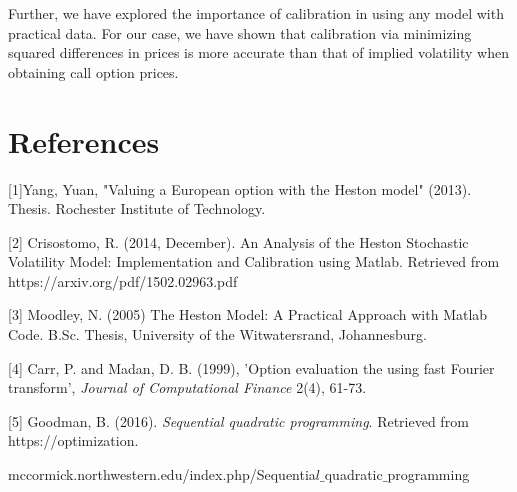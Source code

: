 \documentclass[fontsize=12pt]{article}
\numberwithin{equation}{section} %
\numberwithin{figure}{section} %
\numberwithin{table}{section} %
\begin{document}
	Further, we have explored the importance of calibration in using any model with practical data. For our case, we have shown that calibration via minimizing squared differences in prices is more accurate than that of implied volatility when obtaining call option prices.

\newpage

\section{References} \label{References}

[1]Yang, Yuan, "Valuing a European option with the Heston model" (2013). Thesis. Rochester Institute of Technology. 

[2] Crisostomo, R. (2014, December). An Analysis of the Heston Stochastic Volatility Model:
Implementation and Calibration using Matlab. Retrieved from https://arxiv.org/pdf/1502.02963.pdf

[3] Moodley, N. (2005) The Heston Model: A Practical Approach with Matlab Code. B.Sc. Thesis, University of the Witwatersrand, Johannesburg.

[4] Carr, P. and Madan, D. B. (1999), 'Option evaluation the using fast Fourier transform', \textit{Journal of Computational Finance} 2(4), 61-73.

[5] Goodman, B. (2016). \textit{Sequential quadratic programming}. Retrieved from https://optimization.

mccormick.northwestern.edu/index.php/Sequentia$l\_$quadratic$\_$programming
\end{document}
